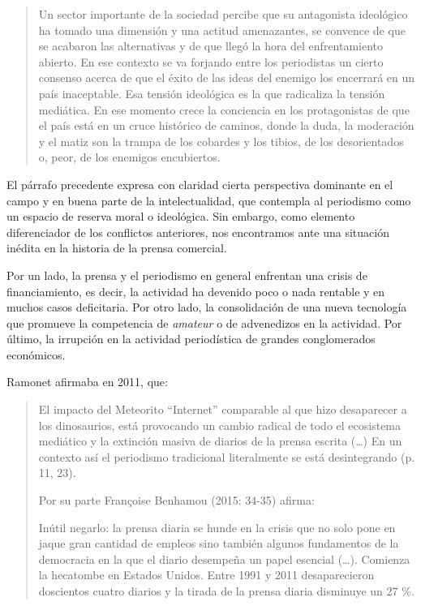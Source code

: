 \begin{quote}
Un sector importante de la sociedad percibe que su antagonista ideológico ha tomado una dimensión y una actitud amenazantes, se convence de que se acabaron las alternativas y de que llegó la hora del enfrentamiento abierto. En ese contexto se va forjando entre los periodistas un cierto consenso acerca de que el éxito de las ideas del enemigo los encerrará en un país inaceptable. Esa tensión ideológica es la que radicaliza la tensión mediática. En ese momento crece la conciencia en los protagonistas de que el país está en un cruce histórico de caminos, donde la duda, la moderación y el matiz son la trampa de los cobardes y los tibios, de los desorientados o, peor, de los enemigos encubiertos.
\end{quote}

El párrafo precedente expresa con claridad cierta perspectiva dominante en el campo y en buena parte de la intelectualidad, que contempla al periodismo como un espacio de reserva moral o ideológica. Sin embargo, como elemento diferenciador de los conflictos anteriores, nos encontramos ante una situación inédita en la historia de la prensa comercial.

Por un lado, la prensa y el periodismo en general enfrentan una crisis de financiamiento, es decir, la actividad ha devenido poco o nada rentable y en muchos casos deficitaria. Por otro lado, la consolidación de una nueva tecnología que promueve la competencia de \emph{amateur} o de advenedizos en la actividad. Por último, la irrupción en la actividad periodística de grandes conglomerados económicos.

Ramonet afirmaba en 2011, que:

\begin{quote}
El impacto del Meteorito ``Internet'' comparable al que hizo desaparecer a los dinosaurios, está provocando un cambio radical de todo el ecosistema mediático y la extinción masiva de diarios de la prensa escrita (\ldots) En un contexto así el periodismo tradicional literalmente se está desintegrando (p. 11, 23).

Por su parte Françoise Benhamou (2015: 34-35) afirma:

Inútil negarlo: la prensa diaria se hunde en la crisis que no solo pone en jaque gran cantidad de empleos sino también algunos fundamentos de la democracia en la que el diario desempeña un papel esencial (\ldots). Comienza la hecatombe en Estados Unidos. Entre 1991 y 2011 desaparecieron doscientos cuatro diarios y la tirada de la prensa diaria disminuye un 27 \%.
\end{quote}

